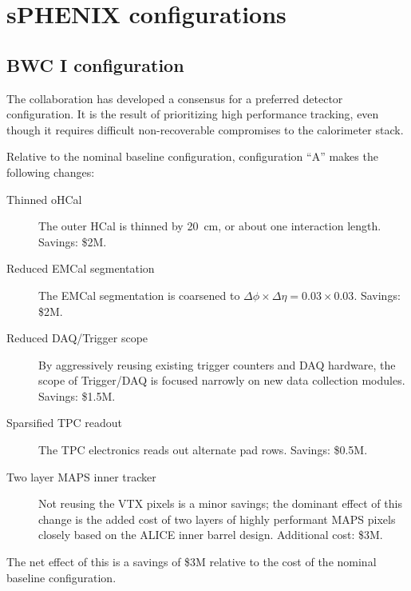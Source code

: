 \chapter*{sPHENIX configurations}
\label{configurations}
\setcounter{page}{1}

\section{BWC I configuration}
\label{sec:bwc-i-configuration}

The collaboration has developed a consensus for a preferred detector
configuration.  It is the result of prioritizing high performance
tracking, even though it requires difficult non-recoverable
compromises to the calorimeter stack. 

Relative to the nominal baseline configuration, configuration ``A''
makes the following changes:

\begin{description}
\item[Thinned oHCal] The outer HCal is thinned by 20~cm, or about one
  interaction length.  Savings: \$2M.
\item[Reduced EMCal segmentation] The EMCal segmentation is coarsened
  to $\Delta\phi \times \Delta\eta =  0.03 \times 0.03$.  Savings:
  \$2M.
\item[Reduced DAQ/Trigger scope] By aggressively reusing existing
  trigger counters and DAQ hardware, the scope of Trigger/DAQ is
  focused narrowly on new data collection modules. Savings: \$1.5M.
\item[Sparsified TPC readout] The TPC electronics reads out alternate
  pad rows. Savings: \$0.5M.
\item[Two layer MAPS inner tracker] Not reusing the VTX pixels is a
  minor savings; the dominant effect of this change is the added cost
  of two layers of highly performant MAPS pixels closely based on the
  ALICE inner barrel design. Additional cost: \$3M.
\end{description}

The net effect of this is a savings of \$3M relative to the cost of
the nominal baseline configuration.

